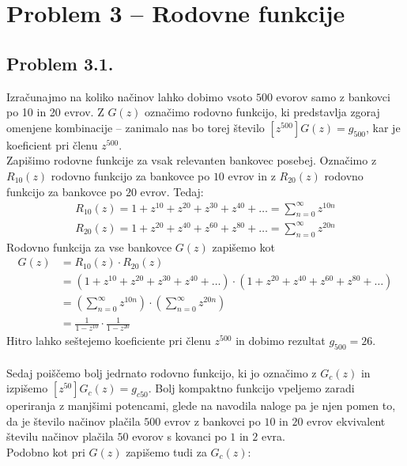 \documentclass[a4paper,11pt]{article}
\begin{document}

\section*{Problem 3 -- Rodovne funkcije}
\subsection*{Problem 3.1.}
Izračunajmo na koliko načinov lahko dobimo vsoto $500$ evorov samo z bankovci po 10 in 20 evrov.
Z $G(z)$ označimo rodovno funkcijo, ki predstavlja zgoraj omenjene kombinacije -- zanimalo nas bo torej število $[z^{500}]G(z) = g_{500}$, kar je koeficient pri členu $z^{500}$. 
\\
Zapišimo rodovne funkcije za vsak relevanten bankovec posebej. Označimo z $R_{10}(z)$ rodovno funkcijo za bankovce po $10$ evrov in z $R_{20}(z)$ rodovno funkcijo za bankovce po $20$ evrov. Tedaj:
\begin{align*}
R_{10}(z) = 1 + z^{10} + z^{20} + z^{30} + z^{40} + \ldots = \sum_{n = 0}^{\infty} z^{10n}
\\
R_{20}(z) =  1 + z^{20} + z^{40} + z^{60} + z^{80} + \ldots = \sum_{n = 0}^{\infty} z^{20n}
\end{align*}
Rodovno funkcija za vse bankovce $G(z)$ zapišemo kot
\begin{align*}
    G(z) &= R_{10}(z) \cdot R_{20}(z) 
    \\
    &= \left( 1 + z^{10} + z^{20} + z^{30} + z^{40} + \ldots \right) \cdot \left( 1 + z^{20} + z^{40} + z^{60} + z^{80} + \ldots \right)
    \\
    &= \left( \sum_{n = 0}^{\infty} z^{10n} \right) \cdot \left( \sum_{n = 0}^{\infty} z^{20n} \right)
    \\
    &= \frac{1}{1 - z^{10}} \cdot \frac{1}{1 - z^{20}}   
\end{align*}
Hitro lahko seštejemo koeficiente pri členu $z^{500}$ in dobimo rezultat $g_{500} = 26$.
\\
\\
Sedaj poiščemo bolj jedrnato rodovno funkcijo, ki jo označimo z $G_c(z)$ in izpišemo $[z^{50}]G_c(z) = g_{c50}$.
Bolj kompaktno funkcijo vpeljemo zaradi operiranja z manjšimi potencami, 
glede na navodila naloge pa je njen pomen to, da je število načinov plačila $500$ evrov z bankovci po $10$ in $20$ evrov ekvivalent številu načinov plačila $50$ evorov s kovanci po $1$ in $2$ evra.
\\
Podobno kot pri $G(z)$ zapišemo tudi za $G_c(z)$:
\end{document}
